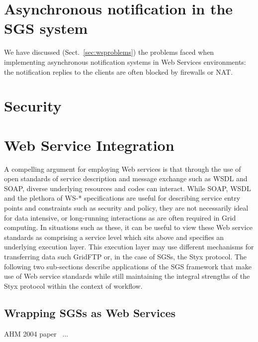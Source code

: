 \documentclass{llncs}
\begin{document}
\section{Asynchronous notification in the SGS system}
We have discussed (Sect.~\ref{sec:wsproblems}) the problems faced when implementing asynchronous notification systems in Web Services environments: the notification replies to the clients are often blocked by firewalls or NAT.  
%
\section{Security}
%

\section{Web Service Integration}
\label{sec:webservices}

A compelling argument for employing Web services is that through the use of open standards of service description and message exchange such as WSDL and SOAP, diverse underlying resources and codes can interact. While SOAP, WSDL and the plethora of WS-* specifications are useful for describing service entry points and constraints such as security and policy, they are not necessarily ideal for data intensive, or long-running interactions as are often required in Grid computing. In situations such as these, it can be useful to view these Web service standards as comprising a service level which sits above and specifies an underlying execution layer. This execution layer may use different mechanisms for transferring data such GridFTP or, in the case of SGSs, the Styx protocol. The following two sub-sections describe applications of the SGS framework that make use of Web service standards while still maintaining the integral strengths of the Styx protocol within the context of workflow.

\subsection{Wrapping SGSs as Web Services}
AHM 2004 paper~\cite{blower:2004} ...
\end{document}
